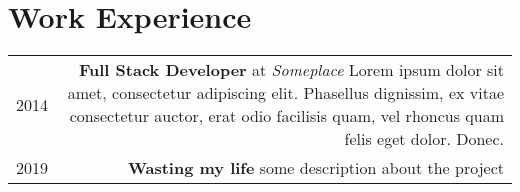 \section*{Work Experience}
\begin{tabular}{L!{\VRule}R}
  2014&\textbf{Full Stack Developer} at \textit{Someplace} Lorem ipsum dolor sit amet, consectetur adipiscing elit. Phasellus dignissim, ex vitae consectetur auctor, erat odio facilisis quam, vel rhoncus quam felis eget dolor. Donec.\\
  2019&\textbf{Wasting my life} some description about the project
\end{tabular}
